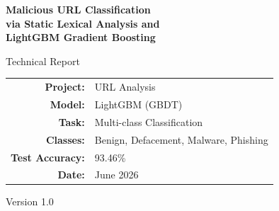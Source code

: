 \documentclass[a4paper,12pt]{article}
\begin{document}
\begin{titlepage}
\centering
\vspace*{2cm}

{\Huge\bfseries Malicious URL Classification\\[0.4cm]
via Static Lexical Analysis and\\[0.4cm]
LightGBM Gradient Boosting}

\vspace{1.5cm}

{\Large Technical Report}

\vspace{2cm}

{\large
\begin{tabular}{rl}
\textbf{Project:}       & URL Analysis \\
\textbf{Model:}         & LightGBM (GBDT) \\
\textbf{Task:}          & Multi-class Classification \\
\textbf{Classes:}       & Benign, Defacement, Malware, Phishing \\
\textbf{Test Accuracy:} & 93.46\% \\
\textbf{Date:}          & June 2026 \\
\end{tabular}
}

\vspace{3cm}
\vfill
{\small Version 1.0}
\end{titlepage}

\begin{abstract}
This report presents a comprehensive malicious URL classification system that relies exclusively on static lexical analysis of Uniform Resource Locator (URL) strings. The proposed system extracts 63 handcrafted numerical features from the raw URL text---encompassing structural, statistical, lexical, and cyber-threat-specific indicators---without issuing any network requests, DNS queries, or page content retrieval. A LightGBM Gradient Boosted Decision Tree (GBDT) classifier is trained on a curated corpus of 661,976 URLs aggregated from the Kaggle Malicious Phish dataset and the URLhaus malware feed. To mitigate domain-level data leakage, Stratified Group $K$-Fold cross-validation is employed, ensuring zero domain overlap between the training, validation, and test partitions. The resulting model achieves a test accuracy of \textbf{93.46\%} across four threat categories---\textit{benign}, \textit{defacement}, \textit{malware}, and \textit{phishing}---while maintaining sub-millisecond inference latency per URL. This report details the complete processing pipeline, the feature engineering methodology, the model training procedure, and the inference architecture.
\end{abstract}
\end{document}
